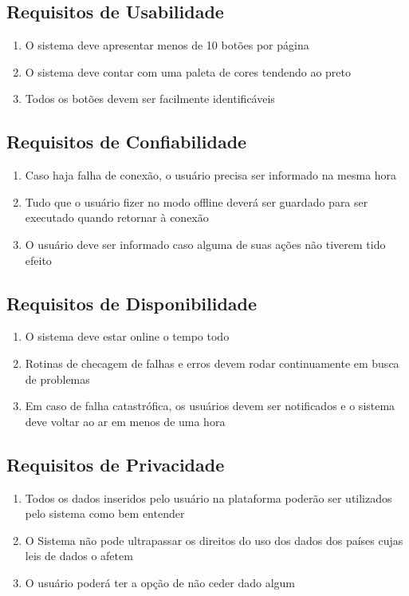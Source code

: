         \subsection{Requisitos de Usabilidade}
            \begin{enumerate}
                \item O sistema deve apresentar menos de 10 botões por página
                \item O sistema deve contar com uma paleta de cores tendendo ao preto
                \item Todos os botões devem ser facilmente identificáveis
            \end{enumerate}
        \subsection{Requisitos de Confiabilidade}
            \begin{enumerate}
                \item Caso haja falha de conexão, o usuário precisa ser informado na mesma hora
                \item Tudo que o usuário fizer no modo offline deverá ser guardado para ser executado quando retornar à conexão
                \item O usuário deve ser informado caso alguma de suas ações não tiverem tido efeito
            \end{enumerate}
        \subsection{Requisitos de Disponibilidade}
            \begin{enumerate}
                \item O sistema deve estar online o tempo todo
                \item Rotinas de checagem de falhas e erros devem rodar continuamente em busca de problemas
                \item Em caso de falha catastrófica, os usuários devem ser notificados e o sistema deve voltar ao ar em menos de uma hora
            \end{enumerate}
        \subsection{Requisitos de Privacidade}
            \begin{enumerate}
                \item Todos os dados inseridos pelo usuário na plataforma poderão ser utilizados pelo sistema como bem entender
                \item O Sistema não pode ultrapassar os direitos do uso dos dados dos países cujas leis de dados o afetem
                \item O usuário poderá ter a opção de não ceder dado algum
            \end{enumerate}
